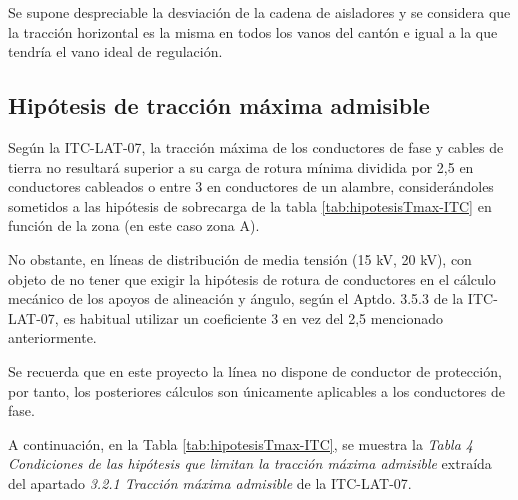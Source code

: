 Se supone despreciable la desviación de la cadena de aisladores y se considera que la tracción horizontal es la misma en todos los vanos del cantón e igual a la que tendría el vano ideal de regulación.

\subsection{Hipótesis de tracción máxima admisible}
\label{subsec:cm-hipotesisTmax}
Según la ITC-LAT-07, la tracción máxima de los conductores de fase y cables de tierra no resultará superior a su carga de rotura mínima dividida por 2,5 en conductores cableados o entre 3 en conductores de un alambre, considerándoles sometidos a las hipótesis de sobrecarga de la tabla \ref{tab:hipotesisTmax-ITC} en función de la zona (en este caso zona A).

No obstante, en líneas de distribución de media tensión (15 kV, 20 kV), con objeto de no tener que exigir la hipótesis de rotura de conductores en el cálculo mecánico de los apoyos de alineación y ángulo, según el Aptdo. 3.5.3 de la ITC-LAT-07, es habitual utilizar un coeficiente 3 en vez del 2,5 mencionado anteriormente.

Se recuerda que en este proyecto la línea no dispone de conductor de protección, por tanto, los posteriores cálculos son únicamente aplicables a los conductores de fase.

A continuación, en la Tabla \ref{tab:hipotesisTmax-ITC}, se muestra la \textit{Tabla 4 Condiciones de las hipótesis que limitan la tracción máxima admisible} extraída del apartado \textit{3.2.1 Tracción máxima admisible} de la ITC-LAT-07.

